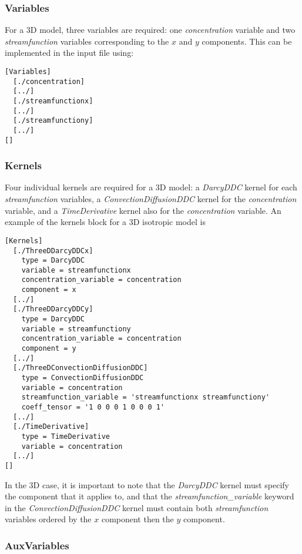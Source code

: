\documentclass[11pt, a4paper]{csiroreport2012}
\begin{document}
\subsubsection*{Variables}

For a 3D model, three variables are required: one \emph{concentration} variable and two \emph{streamfunction} variables corresponding to the $x$ and $y$ components. This can be implemented in the input file using:
\begin{shaded}
\begin{verbatim}
[Variables]  
  [./concentration]  
  [../]  
  [./streamfunctionx]  
  [../]  
  [./streamfunctiony]  
  [../]  
[]
\end{verbatim}
\end{shaded}

\subsubsection*{Kernels}

Four individual kernels are required for a 3D model: a \emph{DarcyDDC} kernel for each \emph{streamfunction} variables, a \emph{ConvectionDiffusionDDC} kernel for the \emph{concentration} variable, and a \emph{TimeDerivative} kernel also for the \emph{concentration} variable. An example of the kernels block for a 3D isotropic model is
\begin{shaded}
\begin{verbatim}
[Kernels]
  [./ThreeDDarcyDDCx]
    type = DarcyDDC
    variable = streamfunctionx
    concentration_variable = concentration
    component = x
  [../]
  [./ThreeDDarcyDDCy]
    type = DarcyDDC
    variable = streamfunctiony
    concentration_variable = concentration
    component = y
  [../]
  [./ThreeDConvectionDiffusionDDC]
    type = ConvectionDiffusionDDC
    variable = concentration
    streamfunction_variable = 'streamfunctionx streamfunctiony'
    coeff_tensor = '1 0 0 0 1 0 0 0 1'
  [../]
  [./TimeDerivative]
    type = TimeDerivative
    variable = concentration
  [../]
[]
\end{verbatim}
\end{shaded}

In the 3D case, it is important to note that the \emph{DarcyDDC} kernel must specify the component that it applies to, and that the \emph{streamfunction\_variable} keyword in the \emph{ConvectionDiffusionDDC} kernel must contain both \emph{streamfunction} variables ordered by the $x$ component then the $y$ component.

\subsubsection*{AuxVariables}
\end{document}
